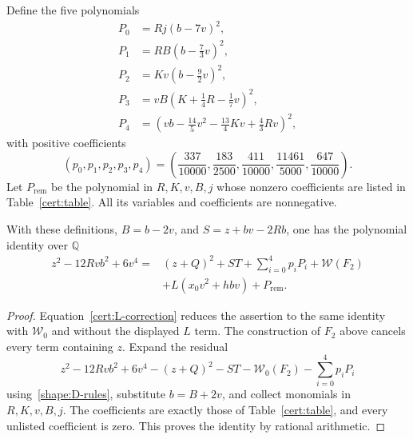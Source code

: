 Define the five polynomials
\begin{equation}\label{cert:squares}
\begin{aligned}
 P_0&=Rj(b-7v)^2,\\
 P_1&=RB\left(b-\frac73v\right)^2,\\
 P_2&=Kv\left(b-\frac92v\right)^2,\\
 P_3&=vB\left(K+\frac14R-\frac17v\right)^2,\\
 P_4&=\left(vb-\frac{14}{5}v^2-\frac{13}{4}Kv+\frac43Rv\right)^2,
\end{aligned}
\end{equation}
with positive coefficients
\begin{equation}\label{cert:constants}
 (p_0,p_1,p_2,p_3,p_4)
 =\left(\frac{337}{10000},\frac{183}{2500},\frac{411}{10000},
         \frac{11461}{5000},\frac{647}{10000}\right).
\end{equation}
Let $P_{\mathrm{rem}}$ be the polynomial in $R,K,v,B,j$ whose nonzero
coefficients are listed in Table~\ref{cert:table}.  All its variables and
coefficients are nonnegative.

\begin{lemma}\label{cert:identity-lemma}
With these definitions, $B=b-2v$, and $S=z+bv-2Rb$, one has the polynomial
identity over $\mathbb Q$
\begin{equation}\label{cert:identity}
\begin{aligned}
 z^2-12Rvb^2+6v^4
  ={}&(z+Q)^2+ST+\sum_{i=0}^4p_iP_i+\mathcal W(F_2)\\
     &+L(x_0v^2+hbv)+P_{\mathrm{rem}}.
\end{aligned}
\end{equation}
\end{lemma}

\begin{proof}
Equation~\eqref{cert:L-correction} reduces the assertion to the same identity
with $\mathcal W_0$ and without the displayed $L$ term.  The construction of
$F_2$ above cancels every term containing $z$.  Expand the residual
\[
 z^2-12Rvb^2+6v^4-(z+Q)^2-ST
       -\mathcal W_0(F_2)-\sum_{i=0}^4p_iP_i
\]
using~\eqref{shape:D-rules}, substitute $b=B+2v$, and collect monomials in
$R,K,v,B,j$.  The coefficients are exactly those of
Table~\ref{cert:table}, and every unlisted coefficient is zero.  This proves
the identity by rational arithmetic.
\end{proof}

